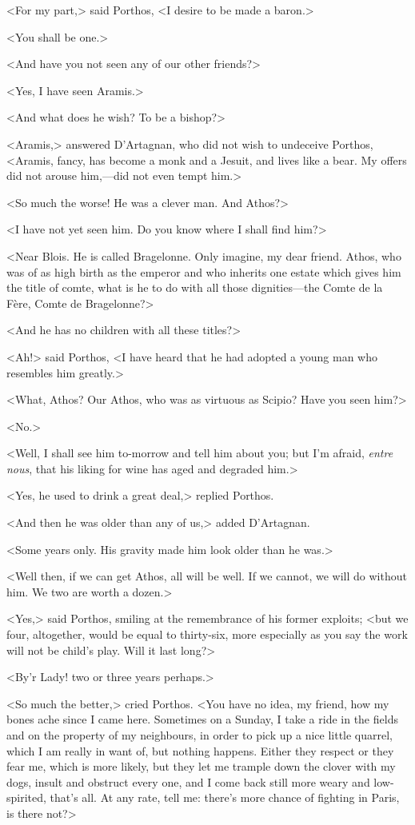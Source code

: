 <For my part,> said Porthos, <I desire to be made a baron.>

<You shall be one.>

<And have you not seen any of our other friends?>

<Yes, I have seen Aramis.>

<And what does he wish? To be a bishop?>

<Aramis,> answered D'Artagnan, who did not wish to undeceive Porthos, <Aramis, fancy, has become a monk and a Jesuit, and lives like a bear. My offers did not arouse him,—did not even tempt him.>

<So much the worse! He was a clever man. And Athos?>

<I have not yet seen him. Do you know where I shall find him?>

<Near Blois. He is called Bragelonne. Only imagine, my dear friend. Athos, who was of as high birth as the emperor and who inherits one estate which gives him the title of comte, what is he to do with all those dignities—the Comte de la Fère, Comte de Bragelonne?>

<And he has no children with all these titles?>

<Ah!> said Porthos, <I have heard that he had adopted a young man who resembles him greatly.>

<What, Athos? Our Athos, who was as virtuous as Scipio? Have you seen him?>

<No.>

<Well, I shall see him to-morrow and tell him about you; but I'm afraid, \textit{entre nous}, that his liking for wine has aged and degraded him.>

<Yes, he used to drink a great deal,> replied Porthos.

<And then he was older than any of us,> added D'Artagnan.

<Some years only. His gravity made him look older than he was.>

<Well then, if we can get Athos, all will be well. If we cannot, we will do without him. We two are worth a dozen.>

<Yes,> said Porthos, smiling at the remembrance of his former exploits; <but we four, altogether, would be equal to thirty-six, more especially as you say the work will not be child's play. Will it last long?>

<By'r Lady! two or three years perhaps.>

<So much the better,> cried Porthos. <You have no idea, my friend, how my bones ache since I came here. Sometimes on a Sunday, I take a ride in the fields and on the property of my neighbours, in order to pick up a nice little quarrel, which I am really in want of, but nothing happens. Either they respect or they fear me, which is more likely, but they let me trample down the clover with my dogs, insult and obstruct every one, and I come back still more weary and low-spirited, that's all. At any rate, tell me: there's more chance of fighting in Paris, is there not?>


